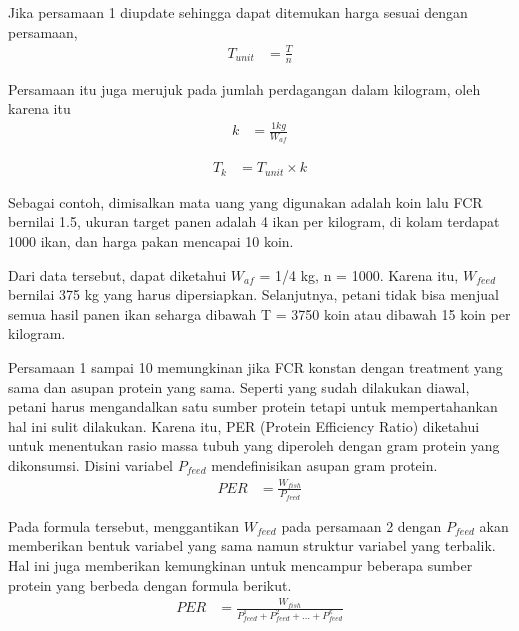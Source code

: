 Jika persamaan 1 diupdate sehingga dapat ditemukan harga sesuai dengan persamaan,
\begin{equation}
    \begin{split}
		T_{unit}
		&= \frac{T}{n}
    \end{split}
\end{equation}

Persamaan itu juga merujuk pada jumlah perdagangan dalam kilogram, oleh karena itu
\begin{equation}
    \begin{split}
		k
		&= \frac{1kg}{W_{af}}
    \end{split}
\end{equation}

\begin{equation}
    \begin{split}
		T_k
		&= T_{unit} \times k
    \end{split}
\end{equation}

Sebagai contoh, dimisalkan mata uang yang digunakan adalah koin lalu FCR bernilai 1.5, ukuran target panen adalah 4 ikan per kilogram, di kolam terdapat 1000 ikan, dan harga pakan mencapai 10 koin.

Dari data tersebut, dapat diketahui $W_{af}$ = 1/4 kg, n = 1000. Karena itu, $W_{feed}$ bernilai 375 kg yang harus dipersiapkan. Selanjutnya, petani tidak bisa menjual semua hasil panen ikan seharga dibawah T = 3750 koin atau dibawah 15 koin per kilogram.

Persamaan 1 sampai 10 memungkinan jika FCR konstan dengan treatment yang sama dan asupan protein yang sama. Seperti yang sudah dilakukan diawal, petani harus mengandalkan satu sumber protein tetapi untuk mempertahankan hal ini sulit dilakukan. Karena itu, PER (Protein Efficiency Ratio) diketahui untuk menentukan rasio massa tubuh yang diperoleh dengan gram protein yang dikonsumsi. Disini variabel $P_{feed}$ mendefinisikan asupan gram protein.
\begin{equation}
    \begin{split}
		PER
		&= \frac{W_{fish}}{P_{feed}}
    \end{split}
\end{equation}

Pada formula tersebut, menggantikan $W_{feed}$ pada persamaan 2 dengan $P_{feed}$ akan memberikan bentuk variabel yang sama namun struktur variabel yang terbalik. Hal ini juga memberikan kemungkinan untuk mencampur beberapa sumber protein yang berbeda dengan formula berikut.
\begin{equation}
    \begin{split}
		PER
		&= \frac{W_{fish}}{P^1_{feed} + P^2_{feed} + \dots + P^k_{feed}}
    \end{split}
\end{equation}

